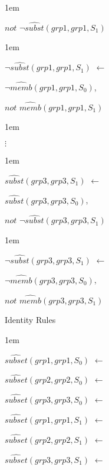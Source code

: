 \documentclass[glov2,twocolumn,final]{svjour2}
\newenvironment{vquote}
  {\begin{list}{}{\leftmargin 1em}\item[]}
  {\end{list}}
\begin{document}
\begin{enumerate}
\begin{vquote}
           \hspace{1em}
           $not$ $\lnot\hat{subst}(grp1, grp1, S_{1})$
         \end{vquote}

         \begin{vquote}
           $\lnot\hat{subst}(grp1, grp1, S_{1})$ $\leftarrow$

           \hspace{1em}
           $\lnot\hat{memb}(grp1, grp1, S_{0})$,

           \hspace{1em}
           $not$ $\hat{memb}(grp1, grp1, S_{1})$
         \end{vquote}

         \begin{vquote}
           \hspace{2em}$\vdots$
         \end{vquote}

         \begin{vquote}
           $\hat{subst}(grp3, grp3, S_{1})$ $\leftarrow$

           \hspace{1em}
           $\hat{subst}(grp3, grp3, S_{0})$,

           \hspace{1em}
           $not$ $\lnot\hat{subst}(grp3, grp3, S_{1})$
         \end{vquote}

         \begin{vquote}
           $\lnot\hat{subst}(grp3, grp3, S_{1})$ $\leftarrow$

           \hspace{1em}
           $\lnot\hat{memb}(grp3, grp3, S_{0})$,

           \hspace{1em}
           $not$ $\hat{memb}(grp3, grp3, S_{1})$
         \end{vquote}
       \item
         Identity Rules

         \begin{vquote}
           $\hat{subset}(grp1, grp1, S_{0})$ $\leftarrow$

           $\hat{subset}(grp2, grp2, S_{0})$ $\leftarrow$

           $\hat{subset}(grp3, grp3, S_{0})$ $\leftarrow$

           $\hat{subset}(grp1, grp1, S_{1})$ $\leftarrow$

           $\hat{subset}(grp2, grp2, S_{1})$ $\leftarrow$

           $\hat{subset}(grp3, grp3, S_{1})$ $\leftarrow$
         \end{vquote}
     \end{enumerate}
\end{document}
